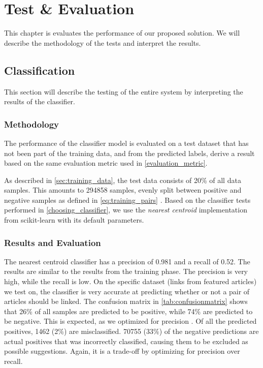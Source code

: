 \chapter{Test \& Evaluation}\label{chap:testeval}
This chapter is evaluates the performance of our proposed solution. We will describe the methodology of the tests and interpret the results.

\section{Classification}
This section will describe the testing of the entire system by interpreting the results of the classifier.

\subsection{Methodology}
The performance of the classifier model is evaluated on a test dataset that has not been part of the training data, and from the predicted labels, derive a result based on the same evaluation metric used in \cref{evaluation_metric}. 

As described in \cref{sec:training_data}, the test data consists of 20\% of all data samples. This amounts to \num{294858} samples, evenly split between positive and negative samples as defined in \cref{eq:training_pairs} . Based on the classifier tests performed in \cref{choosing_classifier}, we use the \emph{nearest centroid} implementation from scikit-learn with its default parameters.

\subsection{Results and Evaluation}
The nearest centroid classifier has a precision of \num{0.981} and a recall of \num{0.52}. The results are similar to the results from the training phase. The precision is very high, while the recall is low. On the specific dataset (links from featured articles) we test on, the classifier is very accurate at predicting whether or not a pair of articles should be linked. The confusion matrix in \cref{tab:confusionmatrix} shows that 26\% of all samples are predicted to be positive, while 74\% are predicted to be negative. This is expected, as we optimized for precision . Of all the predicted positives, \num{1462} (2\%) are misclassified. \num{70755} (33\%) of the negative predictions are actual positives that was incorrectly classified, causing them to be excluded as possible suggestions. Again, it is a trade-off by optimizing for precision over recall. 

